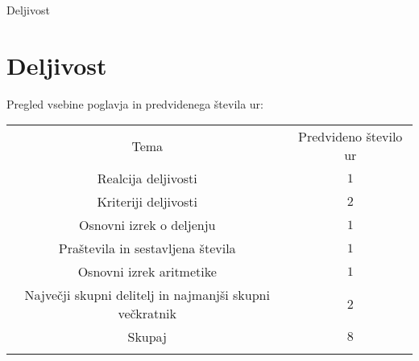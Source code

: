 \begin{priprava}{0}{}{}{Deljivost}{}{}
    
    \chapter{Deljivost}

    \Large{Pregled vsebine poglavja in predvidenega števila ur:}

    \begin{table}[H]
        \centering
        \begin{tabular}{||c|c||} 
        \hhline{|t:==:t|}
        \rowcolor[rgb]{0.843,0.718,0.718} 
        Tema  & Predvideno število ur   \\ 
        \hhline{|:==:|}
        Realcija deljivosti & $1$    \\ 
        \hline
        Kriteriji deljivosti & $2$    \\ 
        \hline
        Osnovni izrek o deljenju & $1$    \\ 
        \hline
        Praštevila in sestavljena števila & $1$     \\
        \hline
        Osnovni izrek aritmetike & $1$     \\
        \hline
        Največji skupni delitelj in najmanjši skupni večkratnik & $2$    \\ 
        \hhline{|:==:|}
        Skupaj & $8$     \\
        \hhline{|b:==:b|}
        \end{tabular}
    \end{table}


    
\end{priprava}